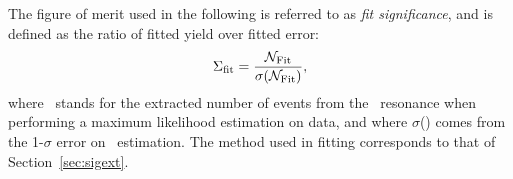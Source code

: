 

The figure of merit used in the following is referred to as
\textit{fit significance}, and is defined as the ratio of fitted yield
over fitted error:
\begin{equation}
\Sigma_{\rm{fit}} = \frac{{\cal N}_{\rm Fit}}{\sigma({\cal N}_{\rm Fit})} ,
\end{equation}
where \NFit\ stands for the extracted number of events from the \PgUa\
resonance when performing a maximum likelihood estimation on data, and
where $\sigma$(\NFit) comes from the 1-$\sigma$ error on \NFit\ estimation.%
The method
used in fitting corresponds to that of Section~\ref{sec:sigext}.%


